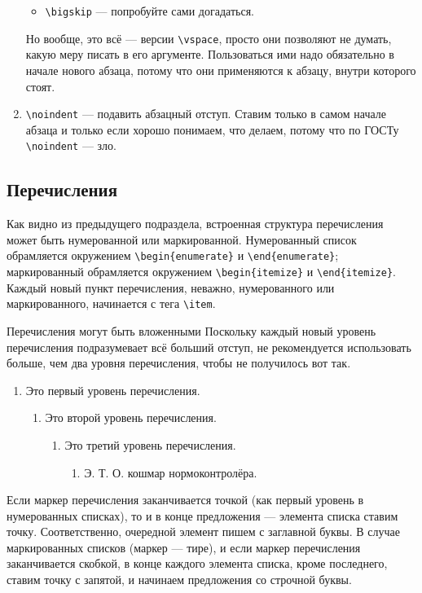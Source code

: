 \documentclass[14pt, russian]{scrartcl}
\begin{document}
\begin{enumerate}
\begin{itemize}
\item \texttt{\textbackslash bigskip} --- попробуйте сами догадаться.
\end{itemize} 
Но вообще, это всё --- версии \texttt{\textbackslash vspace}, просто они позволяют не думать, какую меру писать в его аргументе. Пользоваться ими надо обязательно в начале нового абзаца, потому что они применяются к абзацу, внутри которого стоят. 
\item \texttt{\textbackslash noindent} --- подавить абзацный отступ. Ставим только в самом начале абзаца и только если хорошо понимаем, что делаем, потому что по ГОСТу \texttt{\textbackslash noindent} --- зло.
\end{enumerate}

\subsection{Перечисления}

Как видно из предыдущего подраздела, встроенная структура перечисления может быть нумерованной или маркированной. Нумерованный список обрамляется окружением \texttt{\textbackslash begin\{enumerate\}} и \texttt{\textbackslash end\{enumerate\}}; маркированный обрамляется окружением \texttt{\textbackslash begin\{itemize\}} и \texttt{\textbackslash end\{itemize\}}. Каждый новый пункт перечисления, неважно, нумерованного или маркированного, начинается с тега \texttt{\textbackslash item}. 

Перечисления могут быть вложенными Поскольку каждый новый уровень перечисления подразумевает всё больший отступ, не рекомендуется использовать больше, чем два уровня перечисления, чтобы не получилось вот так.

\begin{enumerate}
\item Это первый уровень перечисления.
\begin{enumerate}
\item Это второй уровень перечисления.
\begin{enumerate}
\item Это третий уровень перечисления.
\begin{enumerate}
\item Э. Т. О. кошмар нормоконтролёра.
\end{enumerate}
\end{enumerate}
\end{enumerate}
\end{enumerate}

Если маркер перечисления заканчивается точкой (как первый уровень в нумерованных списках), то и в конце предложения --- элемента списка ставим точку. Соответственно, очередной элемент пишем с заглавной буквы. В случае маркированных списков (маркер --- тире), и если маркер перечисления заканчивается скобкой, в конце каждого элемента списка, кроме последнего, ставим точку с запятой, и начинаем предложения со строчной буквы.
\end{document}
